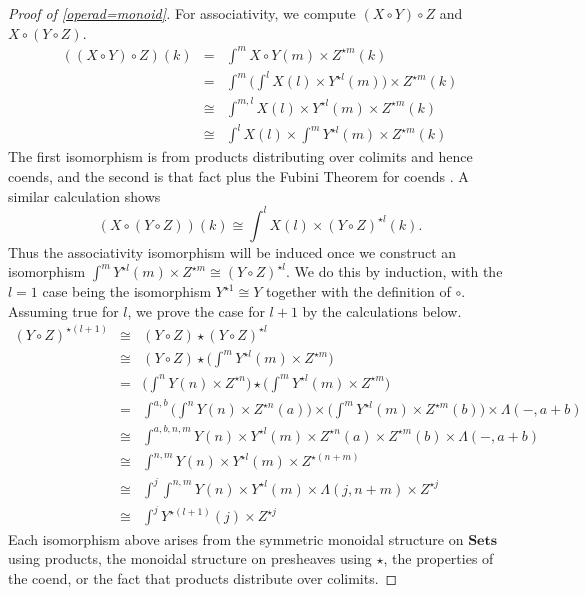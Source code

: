 \documentclass{amsbook} %
\newcommand{\mb}{\mathbf}
\numberwithin{section}{chapter}
\begin{document}
\begin{proof}[Proof of \ref{operad=monoid}]
For associativity, we compute $(X \circ Y) \circ Z$ and $X \circ (Y \circ Z)$.
\[
\begin{array}{rcl}
((X \circ Y) \circ Z) (k) & = & \int^{m} X \circ Y (m) \times Z^{\star m}(k) \\
& = & \int^{m} \big( \int^{l} X(l) \times Y^{\star l}(m) \big) \times Z^{\star m}(k) \\
& \cong & \int^{m,l} X(l) \times Y^{\star l}(m) \times Z^{\star m}(k) \\
& \cong & \int^{l} X(l) \times \int^{m} Y^{\star l}(m) \times Z^{\star m}(k)
\end{array}
\]
The first isomorphism is from products distributing over colimits and hence coends, and the second is that fact plus the Fubini Theorem for coends \cite{maclane-catwork}.  A similar calculation shows
\[
(X \circ (Y \circ Z))(k) \cong \int^{l} X(l) \times (Y \circ Z)^{\star l}(k).
\]
Thus the associativity isomorphism will be induced once we construct an isomorphism $\int^{m} Y^{\star l}(m) \times Z^{\star m} \cong (Y \circ Z)^{\star l}$.  We do this by induction, with the $l=1$ case being the isomorphism $Y^{\star 1} \cong Y$ together with the definition of $\circ.$  Assuming true for $l$, we prove the case for $l+1$ by the calculations below.
\[
\begin{array}{rcl}
(Y \circ Z)^{\star (l+1)} & \cong & (Y \circ Z) \star (Y \circ Z)^{\star l} \\
& \cong & (Y \circ Z) \star \big( \int^{m} Y^{\star l}(m) \times Z^{\star m} \big) \\
& = & \big( \int^{n} Y(n) \times Z^{\star n} \big) \star \big( \int^{m} Y^{\star l}(m) \times Z^{\star m} \big) \\
& = & \int^{a,b} \big( \int^{n} Y(n) \times Z^{\star n}(a) \big)  \times \big( \int^{m} Y^{\star l}(m) \times Z^{\star m}(b) \big) \times \mathbb{\Lambda}(-, a+b) \\
& \cong & \int^{a,b,n,m} Y(n) \times Y^{\star l}(m) \times Z^{\star n}(a) \times Z^{\star m}(b) \times  \mathbb{\Lambda}(-, a+b) \\
& \cong & \int^{n,m} Y(n) \times Y^{\star l}(m) \times Z^{\star (n+m)} \\
& \cong & \int^{j} \int^{n,m} Y(n) \times Y^{\star l}(m) \times \mathbb{\Lambda}(j, n+m) \times Z^{\star j} \\
& \cong & \int^{j} Y^{\star (l+1)}(j) \times Z^{\star j}
\end{array}
\]
Each isomorphism above arises from the symmetric monoidal structure on $\mb{Sets}$ using products, the monoidal structure on presheaves using $\star$, the properties of the coend, or the fact that products distribute over colimits.


\end{proof}
\end{document}
